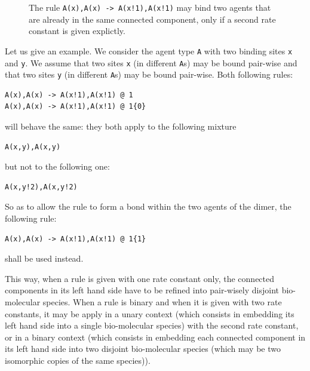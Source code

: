 \documentclass[11pt]{book}
\begin{document}
\begin{figure}[t]
  \hfill\begin{minipage}{0.9\linewidth}
\end{minipage}\hfill\mbox{}
\caption{The rule \texttt{A(x),A(x) -> A(x!1),A(x!1)} may bind two agents that are already in the same connected component, only if a second rate constant is given explictly.}
\end{figure}
  Let us give an example. We consider the agent type \texttt{A} with two binding sites \texttt{x} and \texttt{y}. We assume that two sites \texttt{x} (in different \texttt{A}s) may be bound pair-wise and that two sites \texttt{y} (in different \texttt{A}s) may be bound pair-wise. Both following rules:
\begin{lstlisting}[language=kappa]
A(x),A(x) -> A(x!1),A(x!1) @ 1
A(x),A(x) -> A(x!1),A(x!1) @ 1{0}
\end{lstlisting}
  will behave the same: they both apply to the following mixture
\begin{lstlisting}[language=kappa]
A(x,y),A(x,y)
\end{lstlisting}
  but not to the following one:
\begin{lstlisting}[language=kappa]
A(x,y!2),A(x,y!2)
\end{lstlisting}

  So as to allow the rule to form a bond within the two agents of the dimer, the following rule:
  \begin{lstlisting}[language=kappa]
A(x),A(x) -> A(x!1),A(x!1) @ 1{1}
  \end{lstlisting}
   shall be used instead.

  This way, when a rule is given with one rate constant only, the connected components in its left hand side have to be refined into pair-wisely disjoint bio-molecular species. When a rule is binary and when it is given with two rate constants,  it may be apply in a unary context (which consists in embedding its left hand side into a single bio-molecular species) with the second rate constant, or in a binary context (which consists in embedding each connected component in its left hand side into two disjoint bio-molecular species (which may be two isomorphic copies of the same species)).
\end{document}
